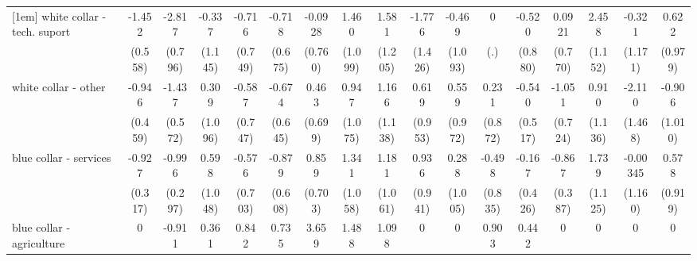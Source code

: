{\begin{tabular}{l*{16}{c}}
[1em]
white collar - tech. suport&      -1.452\sym{**} &      -2.817\sym{***}&      -0.337         &      -0.716         &      -0.718         &     -0.0928         &       1.460         &       1.581         &      -1.776         &      -0.469         &           0         &      -0.520         &      0.0921         &       2.458\sym{*}  &      -0.321         &       0.622         \\
                    &     (0.558)         &     (0.796)         &     (1.145)         &     (0.749)         &     (0.675)         &     (0.760)         &     (1.099)         &     (1.205)         &     (1.426)         &     (1.093)         &         (.)         &     (0.880)         &     (0.770)         &     (1.152)         &     (1.171)         &     (0.979)         \\
[1em]
white collar - other&      -0.946\sym{*}  &      -1.437\sym{*}  &       0.309         &      -0.587         &      -0.674         &       0.463         &       0.947         &       1.166         &       0.619         &       0.559         &       0.231         &      -0.540         &      -1.051         &       0.910         &      -2.110         &      -0.906         \\
                    &     (0.459)         &     (0.572)         &     (1.096)         &     (0.747)         &     (0.645)         &     (0.699)         &     (1.075)         &     (1.138)         &     (0.953)         &     (0.972)         &     (0.872)         &     (0.517)         &     (0.724)         &     (1.136)         &     (1.468)         &     (1.010)         \\
[1em]
blue collar - services&      -0.927\sym{**} &      -0.996\sym{***}&       0.598         &      -0.576         &      -0.879         &       0.859         &       1.341         &       1.181         &       0.936         &       0.288         &      -0.498         &      -0.167         &      -0.867\sym{*}  &       1.739         &    -0.00345         &       0.578         \\
                    &     (0.317)         &     (0.297)         &     (1.048)         &     (0.703)         &     (0.608)         &     (0.703)         &     (1.058)         &     (1.061)         &     (0.941)         &     (1.005)         &     (0.835)         &     (0.426)         &     (0.387)         &     (1.125)         &     (1.160)         &     (0.919)         \\
[1em]
blue collar - agriculture&           0         &      -0.911         &       0.361         &       0.842         &       0.735         &       3.659\sym{*}  &       1.488         &       1.098         &           0         &           0         &       0.903         &       0.442         &           0         &           0         &           0         &           0         \\

\end{tabular}}
